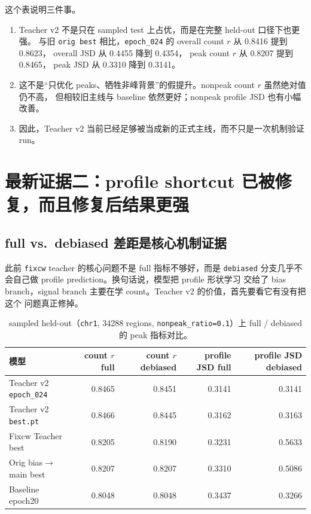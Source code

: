 \documentclass[11pt,a4paper]{ctexart}
\begin{document}
这个表说明三件事。

\begin{enumerate}[leftmargin=2em]
  \item Teacher v2 不是只在 sampled test 上占优，而是在完整 held-out 口径下也更强。
  与旧 \texttt{orig best} 相比，\texttt{epoch\_024} 的
  overall count $r$ 从 0.8416 提到 0.8623，
  overall JSD 从 0.4455 降到 0.4354，
  peak count $r$ 从 0.8207 提到 0.8465，
  peak JSD 从 0.3310 降到 0.3141。

  \item 这不是“只优化 peaks、牺牲非峰背景”的假提升。nonpeak count $r$ 虽然绝对值仍不高，
  但相较旧主线与 baseline 依然更好；nonpeak profile JSD 也有小幅改善。

  \item 因此，Teacher v2 当前已经足够被当成新的正式主线，而不只是一次机制验证 run。
\end{enumerate}

\section{最新证据二：profile shortcut 已被修复，而且修复后结果更强}

\subsection{full vs.\ debiased 差距是核心机制证据}

此前 \texttt{fixcw} teacher 的核心问题不是 full 指标不够好，而是
\texttt{debiased} 分支几乎不会自己做 profile prediction。换句话说，模型把 profile 形状学习
交给了 bias branch，signal branch 主要在学 count。Teacher v2 的价值，首先要看它有没有把这个
问题真正修掉。

\begin{table}[H]
\centering
\small
\caption{sampled held-out（\texttt{chr1}, 34288 regions, \texttt{nonpeak\_ratio=0.1}）上 full / debiased 的 peak 指标对比。}
\begin{tabular}{lrrrr}
\toprule
模型 & count $r$ full & count $r$ debiased & profile JSD full & profile JSD debiased \\
\midrule
Teacher v2 \texttt{epoch\_024} & 0.8465 & 0.8451 & 0.3141 & 0.3141 \\
Teacher v2 \texttt{best.pt} & 0.8466 & 0.8445 & 0.3162 & 0.3163 \\
Fixcw Teacher best & 0.8205 & 0.8190 & 0.3231 & 0.5633 \\
Orig bias$\to$main best & 0.8207 & 0.8207 & 0.3310 & 0.5086 \\
Baseline epoch20 & 0.8048 & 0.8048 & 0.3437 & 0.3266 \\
\bottomrule
\end{tabular}
\end{table}
\end{document}
